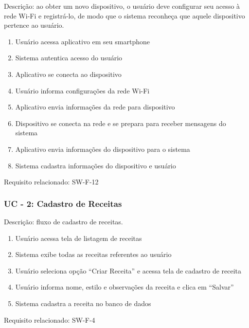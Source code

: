 Descrição: ao obter um novo dispositivo, o usuário deve configurar seu acesso à rede Wi-Fi e registrá-lo, de modo que o sistema reconheça que aquele 
dispositivo pertence ao usuário.
\begin{enumerate}
    \item Usuário acessa aplicativo em seu smartphone
    \item Sistema autentica acesso do usuário
    \item Aplicativo se conecta ao dispositivo
    \item Usuário informa configurações da rede Wi-Fi
    \item Aplicativo envia informações da rede para dispositivo
    \item Dispositivo se conecta na rede e se prepara para receber mensagens do sistema
    \item Aplicativo envia informações do dispositivo para o sistema
    \item Sistema cadastra informações do dispositivo e usuário
\end{enumerate}
Requisito relacionado: SW-F-12

\subsubsection*{UC - 2: Cadastro de Receitas}
Descrição: fluxo de cadastro de receitas.
\begin{enumerate}
    \item Usuário acessa tela de listagem de receitas
    \item Sistema exibe todas as receitas referentes ao usuário
    \item Usuário seleciona opção “Criar Receita” e acessa tela de cadastro de receita
    \item Usuário informa nome, estilo e observações da receita e clica em “Salvar”
    \item Sistema cadastra a receita no banco de dados
\end{enumerate}
Requisito relacionado: SW-F-4

